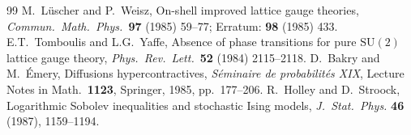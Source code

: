 \documentclass[11pt]{article}
\theoremstyle{definition}
\newcommand{\SU}{\mathrm{SU}}
\begin{document}
\begin{thebibliography}{99}
 M.~L\"uscher and P.~Weisz, On-shell improved lattice
gauge theories, \emph{Commun.\ Math.\ Phys.}\ \textbf{97} (1985) 59--77;
Erratum: \textbf{98} (1985) 433.
 E.T.~Tomboulis and L.G.~Yaffe, Absence of phase
transitions for pure $\SU(2)$ lattice gauge theory,
\emph{Phys.\ Rev.\ Lett.}\ \textbf{52} (1984) 2115--2118.
 D.~Bakry and M.~\'Emery, Diffusions
hypercontractives, \emph{S\'eminaire de probabilit\'es XIX},
Lecture Notes in Math.\ \textbf{1123}, Springer, 1985, pp.~177--206.
 R.~Holley and D.~Stroock, Logarithmic Sobolev
inequalities and stochastic Ising models, \textit{J.\ Stat.\ Phys.}
\textbf{46} (1987), 1159--1194.
\end{thebibliography}
\end{document}
